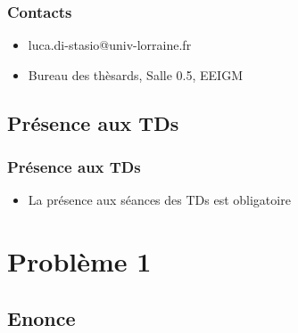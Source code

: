 \documentclass[first,firstsupp,lastsupp,handout,last,hyperref,table]{ETHclass}
\begin{document}
\begin{frame}
\frametitle{\small Contacts}
\vspace{-0.75cm}
\centering
\captionsetup[subfigure]{labelfont=footnotesize}
\begin{itemize}
\item luca.di-stasio@univ-lorraine.fr
\item Bureau des th\`esards, Salle 0.5, EEIGM
\end{itemize}
\end{frame}

\subsection{Pr\'esence aux TDs}

\begin{frame}
\frametitle{\small Pr\'esence aux TDs}
\vspace{-0.25cm}
\centering
\scriptsize
\begin{itemize}[label=]
\item La pr\'esence aux s\'eances des TDs est obligatoire
\end{itemize}
\end{frame}

\section{Probl\`eme 1}

\subsection{Enonce}
\end{document}
